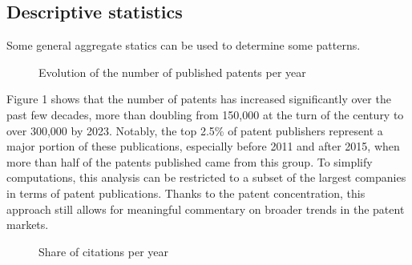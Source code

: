 \documentclass[12pt]{article}
\begin{document}
\subsection{Descriptive statistics}
Some general aggregate statics can be used to determine some patterns. 
\begin{figure}[h]
\caption{Evolution of the number of published patents per year}
\centering
\end{figure}
Figure 1 shows that the number of patents has increased significantly over the past few decades, more than doubling from 150,000 at the turn of the century to over 300,000 by 2023. Notably, the top 2.5\% of patent publishers represent a major portion of these publications, especially before 2011 and after 2015, when more than half of the patents published came from this group. To simplify computations, this analysis can be restricted to a subset of the largest companies in terms of patent publications. Thanks to the patent concentration, this approach still allows for meaningful commentary on broader trends in the patent markets.

\begin{figure}[h]
\caption{Share of citations per year}
\centering
\end{figure}
\end{document}
